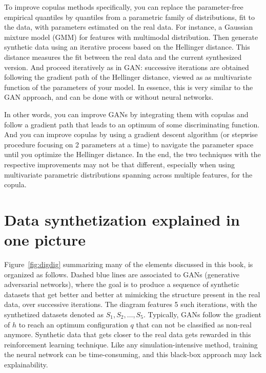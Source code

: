 \documentclass[oneside,10pt]{book}
\begin{document}
To improve copulas methods specifically, you can replace the 
parameter-free \textcolor{index}{empirical quantiles} by quantiles from a parametric family of distributions, fit to the data, with parameters estimated on the real data. For instance, a \textcolor{index}{Gaussian mixture model} (GMM) for features with multimodal distribution. Then generate synthetic data using an iterative process 
 based on the 
 \textcolor{index}{Hellinger distance}. This distance measures the fit between the real data and the current synthesized version. And proceed iteratively as in GAN: successive iterations are obtained following the gradient path of the Hellinger distance, viewed as as multivariate function of the parameters of your model. In essence, this is very similar to the GAN approach, and can be done with or without neural networks.

In other words, you can improve GANs by integrating them with copulas and follow a gradient path that leads to an optimum of some discriminating function. And you can improve copulas by using a gradient descent algorithm (or stepwise procedure focusing on 2 parameters at a time) to navigate the parameter space until you optimize the Hellinger distance.
 In the end, the two techniques with the respective improvements may not be that different, especially when using multivariate parametric distributions spanning across multiple features, for the copula. 


\section{Data synthetization explained in one picture}

Figure~\ref{fig:digdig} summarizing many of the elements discussed in this book, is organized as follows. Dashed blue lines are associated to GANs 
(\textcolor{index}{generative adversarial networks}), where the goal is to produce a sequence of synthetic datasets that get better and better at mimicking the structure present in the real data, over successive iterations. The diagram features 5 such iterations, with the synthetized datasets denoted as $S_1,S_2,\dots,S_5$. Typically, GANs follow the gradient of $h$ to reach an optimum configuration $q$ that can not be classified as  
non-real anymore. Synthetic data that gets closer to the real data gets rewarded in this 
\textcolor{index}{reinforcement learning} technique. Like any
 simulation-intensive method, training the neural network can be time-consuming, and this black-box approach
 may lack \textcolor{index}{explainability}.
\end{document}
